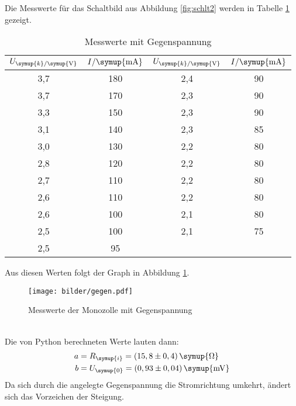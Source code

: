 \newpage
Die Messwerte für das Schaltbild aus Abbildung \ref{fig:schlt2} werden in
Tabelle \ref{tab:ggn} gezeigt.
\begin{table}[H]
  \centering
  \begin{tabular}{c c c c}
    \toprule
    $U_{\symup{k}/\symup{\si{\volt}}}$ & $I/\symup{\si{\milli\ampere}}$  &
    $U_{\symup{k}/\symup{\si{\volt}}}$ & $I/\symup{\si{\milli\ampere}}$  \\
    \midrule
    3,7  &  180  &  2,4  &  90  \\
    3,7  &  170  &  2,3  &  90  \\
    3,3  &  150  &  2,3  &  90  \\
    3,1  &  140  &  2,3  &  85  \\
    3,0  &  130  &  2,2  &  80  \\
    2,8  &  120  &  2,2  &  80  \\
    2,7  &  110  &  2,2  &  80  \\
    2,6  &  110  &  2,2  &  80  \\
    2,6  &  100  &  2,1  &  80  \\
    2,5  &  100  &  2,1  &  75  \\
    2,5  &   95  &  \hrulefill  &  \hrulefill \\
    \bottomrule
  \end{tabular}
  \caption{Messwerte mit Gegenspannung}
  \label{tab:ggn}
\end{table}
Aus diesen Werten folgt der Graph in Abbildung \ref{fig:ggn}.
\begin{figure}
  \centering
  \texttt{[image: bilder/gegen.pdf]}
  \caption{Messwerte der Monozolle mit Gegenspannung}
  \label{fig:ggn}
\end{figure}
\\
Die von Python berechneten Werte lauten dann:
\begin{align*}
   a &= R_\symup{i} = (15,8 \pm 0,4)\, \symup{\si{\ohm}} \\ %
   b &= U_\symup{0} = (0,93 \pm 0,04)\,\symup{\si{\milli\volt}}
\end{align*}
Da sich durch die angelegte Gegenspannung die Stromrichtung umkehrt, ändert sich
das Vorzeichen der Steigung.



